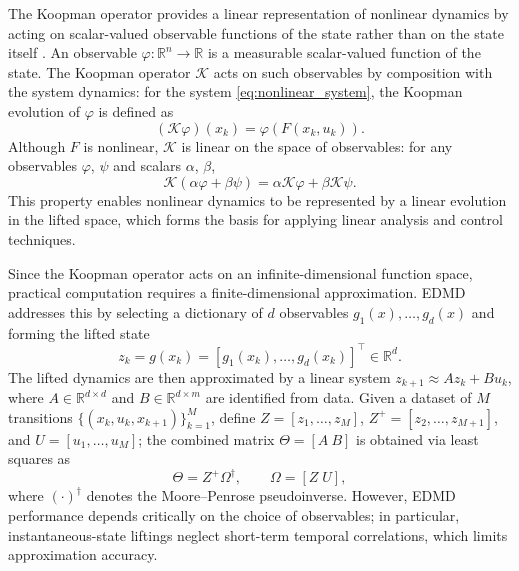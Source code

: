 \documentclass[journal]{IEEEtran}
\begin{document}
The Koopman operator provides a linear representation of nonlinear dynamics by acting on scalar-valued observable functions of the state rather than on the state itself \cite{koopman1931hamiltonian, mezic2005spectral, rowley2009spectral, brunton2022modern}. An observable $\varphi:\mathbb{R}^n\to\mathbb{R}$ is a measurable scalar-valued function of the state. The Koopman operator $\mathcal{K}$ acts on such observables by composition with the system dynamics: for the system \eqref{eq:nonlinear_system}, the Koopman evolution of $\varphi$ is defined as
\begin{equation}
    (\mathcal{K}\varphi)(x_k) = \varphi(F(x_k,u_k)).
    \label{eq:koopman_operator}
\end{equation}
Although $F$ is nonlinear, $\mathcal{K}$ is linear on the space of observables: for any observables $\varphi$, $\psi$ and scalars $\alpha$, $\beta$,
\begin{equation}
    \mathcal{K}(\alpha \varphi + \beta \psi)
    = \alpha \mathcal{K}\varphi + \beta \mathcal{K}\psi.
    \label{eq:koopman_linearity}
\end{equation}
This property enables nonlinear dynamics to be represented by a linear evolution in the lifted space, which forms the basis for applying linear analysis and control techniques.

Since the Koopman operator acts on an infinite-dimensional function space, practical computation requires a finite-dimensional approximation. EDMD addresses this by selecting a dictionary of $d$ observables $g_1(x),\ldots,g_d(x)$ and forming the lifted state
\begin{equation}
    z_k = g(x_k) = [g_1(x_k), \ldots, g_d(x_k)]^\top \in \mathbb{R}^d.
    \label{eq:instantaneous_lifting}
\end{equation}
The lifted dynamics are then approximated by a linear system $z_{k+1} \approx A z_k + B u_k$, where $A \in \mathbb{R}^{d \times d}$ and $B \in \mathbb{R}^{d \times m}$ are identified from data. Given a dataset of $M$ transitions $\{(x_k, u_k, x_{k+1})\}_{k=1}^M$, define $Z = [z_1,\ldots,z_M]$, $Z^+ = [z_2,\ldots,z_{M+1}]$, and $U = [u_1,\ldots,u_M]$; the combined matrix $\Theta = [A\ B]$ is obtained via least squares as
\begin{equation}
    \Theta = Z^+ \Omega^\dagger, \qquad \Omega = [Z\; U],
    \label{eq:edmd_regression}
\end{equation}
where $(\cdot)^\dagger$ denotes the Moore--Penrose pseudoinverse. However, EDMD performance depends critically on the choice of observables; in particular, instantaneous-state liftings neglect short-term temporal correlations, which limits approximation accuracy.
\end{document}
